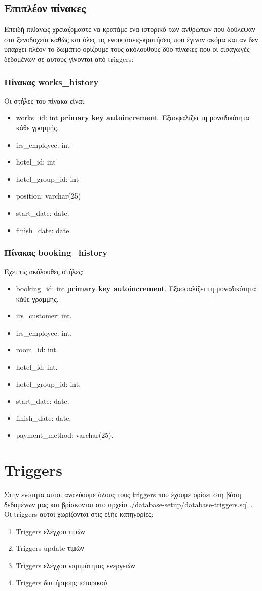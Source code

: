 \documentclass[a4paper,oneside, 11pt]{article}
\begin{document}
\subsection{Επιπλέον πίνακες}
Επειδή πιθανώς χρειαζόμαστε να κρατάμε ένα ιστορικό των ανθρώπων που δούλεψαν στα ξενοδοχεία καθώς και όλες τις ενοικιάσεις-κρατήσεις που έγιναν ακόμα και αν δεν υπάρχει πλέον το δωμάτιο ορίζουμε τους ακόλουθους δύο πίνακες που οι εισαγωγές δεδομένων σε αυτούς γίνονται από triggers: 

\subsubsection{Πίνακας works\_history}
Οι στήλες του πίνακα είναι: 
\begin{itemize}
\item works\_id: int \textbf{primary key autoincrement}. Εξασφαλίζει τη μοναδικότητα κάθε γραμμής.
\item irs\_employee: int 
\item hotel\_id: int 
\item hotel\_group\_id: int
\item position: varchar(25)
\item start\_date: date.
\item finish\_date: date.
\end{itemize}
\subsubsection{Πίνακας booking\_history}
Έχει τις ακόλουθες στήλες:
\begin{itemize}
\item booking\_id: int \textbf{primary key autoincrement}. Εξασφαλίζει τη μοναδικότητα κάθε γραμμής.
\item irs\_customer: int.
\item irs\_employee: int. 
\item room\_id: int.
\item hotel\_id: int.
\item hotel\_group\_id: int.
\item start\_date: date.
\item finish\_date: date.
\item payment\_method: varchar(25).
\end{itemize}

\section{Triggers}
Στην ενότητα αυτοί αναλύουμε όλους τους triggers που έχουμε ορίσει στη βάση δεδομένων μας και βρίσκονται στο αρχείο ./database-setup/database-triggers.sql . \bigbreak 
Οι triggers αυτοί χωρίζονται στις εξής κατηγορίες:
\begin{enumerate}
\item Triggers ελέγχου τιμών
\item Triggers update τιμών
\item Triggers ελέγχου νομιμότητας ενεργειών
\item Triggers διατήρησης ιστορικού
\end{enumerate}
\end{document}
